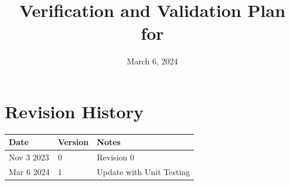 \documentclass[12pt, titlepage]{article}
\begin{document}
\title{Verification and Validation Plan for \progname{}} 
\author{\authname}
\date{March 6, 2024}
	
\maketitle


\section*{Revision History}

\begin{tabularx}{\textwidth}{p{3cm}p{2cm}X}
\toprule {\bf Date} & {\bf Version} & {\bf Notes}\\
\midrule
Nov 3 2023 & 0 & Revision 0\\
Mar 6 2024 & 1 & Update with Unit Testing\\
\bottomrule
\end{tabularx}



\newpage

\tableofcontents



\newpage

\end{document}
